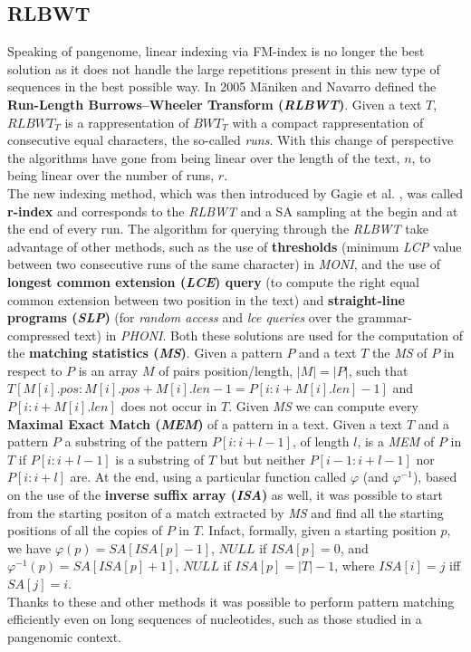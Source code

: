 \documentclass[a4paper,11pt, oneside]{article}
\begin{document}
\subsection*{RLBWT}
Speaking of pangenome, linear indexing via FM-index is no longer the best
solution as it does not handle the large repetitions present in this new type of
sequences in the best possible way. In 2005 M\"{a}niken and Navarro defined
the \textbf{Run-Length Burrows–Wheeler Transform (\textit{RLBWT})}. Given a text
$T$, $RLBWT_T$ is a rappresentation of $BWT_T$ with a compact rappresentation of
consecutive equal characters, the so-called \textit{runs}. With this change of
perspective the algorithms have gone from being linear over the length of the
text, $n$, to being linear over the number of runs, $r$. \\
The new indexing method, which was then introduced by Gagie et
al.
, was called \textbf{r-index} and corresponds to the
\textit{RLBWT} and a SA sampling at the begin and at the end of every run. The
algorithm for querying through the \textit{RLBWT} take advantage of other
methods, such as the use of \textbf{thresholds} (minimum
\textit{LCP} value between two consecutive runs of the same character) in
\textit{MONI}, and the use of \textbf{longest common extension (\textit{LCE})
  query} (to compute the right equal common extension between two position in
the text)
and \textbf{straight-line programs (\textit{SLP})}
(for \textit{random access} and \textit{lce queries} over the
grammar-compressed text) in \textit{PHONI}. Both these solutions are used for
the computation of the \textbf{matching statistics (\textit{MS})}. Given a
pattern $P$ and a text $T$ the \textit{MS} of $P$ in respect to $P$ is an array
$M$ of pairs position/length, $|M|=|P|$, such that
$T[M[i].pos:M[i].pos+M[i].len-1=P[i:i+M[i].len]-1]$ and $P[i:i+M[i].len]$ does
not occur in $T$. Given \textit{MS} we can compute every \textbf{Maximal Exact
  Match (\textit{MEM})} of a pattern in a text. Given a text $T$ and a pattern
$P$ a substring of the pattern $P[i : i+l-1]$, of length $l$, is a \textit{MEM}
of $P$ in $T$ if $P[i:i+l-1]$ is a substring of $T$ but but neither
$P[i-1:i+l-1]$ nor $P[i:i+l]$ are. At the end, using a particular function
called $\varphi$ (and $\varphi^{-1}$), based on the use of the \textbf{inverse
  suffix array (\textit{ISA})} as well, it was possible to start from the
starting positon of a match extracted 
by \textit{MS} and find all the starting positions of all the copies of $P$ in
$T$. Infact, formally, given a starting position $p$, we have
$\varphi(p)=SA[ISA[p]-1]$, $NULL$ if $ISA[p]=0$, and
$\varphi^{-1}(p)=SA[ISA[p]+1]$, $NULL$ if $ISA[p]=|T|-1$, where $ISA[i]=j$ iff
$SA[j]=i$.\\   
Thanks to these and other methods it was possible to perform pattern matching
efficiently even on long sequences of nucleotides, such as those studied in
a pangenomic context. 
\end{document}
